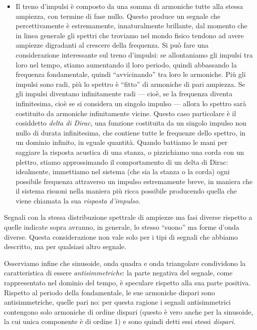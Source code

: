 \begin{itemize}
\item Il treno d'impulsi è composto da una somma di armoniche tutte alla stessa ampiezza, con termine di fase nullo. Questo produce un segnale che percettivamente è estremamente, innaturalmente brillante, dal momento che in linea generale gli spettri che troviamo nel mondo fisico tendono ad avere ampiezze digradanti al crescere della frequenza. Si può fare una considerazione interessante sul treno d'impulsi: se allontaniamo gli impulsi tra loro nel tempo, stiamo aumentando il loro periodo, quindi abbassando la frequenza fondamentale, quindi ``avvicinando'' tra loro le armoniche. Più gli impulsi sono radi, più lo spettro è ``fitto'' di armoniche di pari ampiezza. Se gli impulsi diventano infinitamente radi --- cioè, se la frequenza diventa infinitesima, cioè se si considera un singolo impulso --- allora lo spettro sarà costituito da armoniche infinitamente vicine. Questo caso particolare è il cosiddetto \emph{delta di Dirac}, una funzione costituita da un singolo impulso non nullo di durata infinitesima, che contiene tutte le frequenze dello spettro, in un dominio infinito, in eguale quantità. Quando battiamo le mani per saggiare la risposta acustica di una stanza, o pizzichiamo una corda con un plettro, stiamo approssimando il comportamento di un delta di Dirac: idealmente, immettiamo nel sistema (che sia la stanza o la corda) ogni possibile frequenza attraverso un impulso estremamente breve, in maniera che il sistema risuoni nella maniera più ricca possibile producendo quella che viene chiamata la sua \emph{risposta d'impulso}.

\end{itemize}

Segnali con la stessa distribuzione spettrale di ampiezze ma fasi diverse rispetto a quelle indicate sopra avranno, in generale, lo stesso ``suono'' ma forme d'onda diverse. Questa considerazione non vale solo per i tipi di segnali che abbiamo descritto, ma per qualsiasi altro segnale.

Osserviamo infine che sinusoide, onda quadra e onda triangolare condividono la caratteristica di essere \emph{antisimmetriche}: la parte negativa del segnale, come rappresentato nel dominio del tempo, è speculare rispetto alla sua parte positiva. Rispetto al periodo della fondamentale, le sue armoniche dispari sono antisimmetriche, quelle pari no: per questa ragione i segnali antisimmetrici contengono solo armoniche di ordine dispari (questo è vero anche per la sinusoide, la cui unica componente è di ordine 1) e sono quindi detti essi stessi \emph{dispari}.



